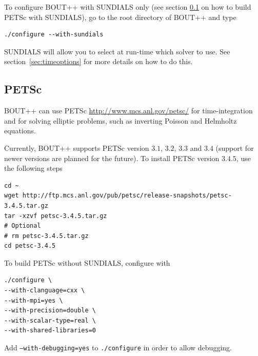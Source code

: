 \documentclass[12pt]{article}
\begin{document}
To configure BOUT++ with SUNDIALS only (see section \ref{sec:PETSc} on how to
build PETSc with SUNDIALS), go to the root directory of BOUT++ and type
%
\begin{verbatim}
./configure --with-sundials
\end{verbatim}
%
SUNDIALS will allow you to select at run-time which solver to use. See
section~\ref{sec:timeoptions} for more details on how to do this.



\subsection{PETSc}
\label{sec:PETSc}
%
BOUT++ can use PETSc \url{http://www.mcs.anl.gov/petsc/} for time-integration
and for solving elliptic problems, such as inverting Poisson and Helmholtz
equations.

Currently, BOUT++ supports PETSc version $3.1$, $3.2$, $3.3$ and $3.4$ (support
for newer versions are planned for the future). To install PETSc version
$3.4.5$, use the following steps
%
\begin{verbatim}
cd ~
wget http://ftp.mcs.anl.gov/pub/petsc/release-snapshots/petsc-3.4.5.tar.gz
tar -xzvf petsc-3.4.5.tar.gz
# Optional
# rm petsc-3.4.5.tar.gz
cd petsc-3.4.5
\end{verbatim}
%
To build PETSc without SUNDIALS, configure with
%
\begin{verbatim}
./configure \
--with-clanguage=cxx \
--with-mpi=yes \
--with-precision=double \
--with-scalar-type=real \
--with-shared-libraries=0
\end{verbatim}
%
Add \texttt{--with-debugging=yes} to \texttt{./configure} in order to allow
debugging.
\end{document}
